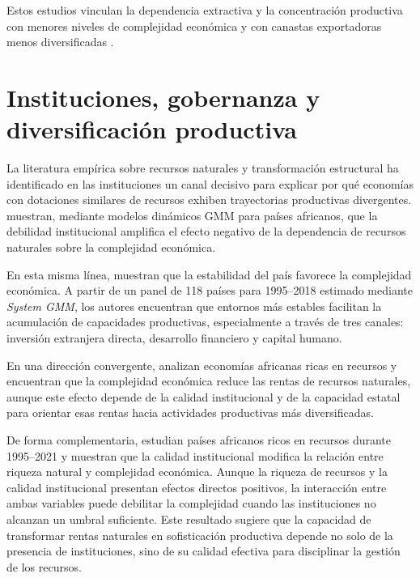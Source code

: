 \documentclass[../../PTFM.tex]{subfiles}
\begin{document}
	Estos estudios vinculan la dependencia extractiva y la concentración productiva con menores niveles de complejidad económica y con canastas exportadoras menos diversificadas \parencite{Canh2020,Bahar2018,Joya2015,Lashitew2021}.

	\section{Instituciones, gobernanza y diversificación productiva}
	\label{sec:instituciones-gobernanza-diversificacion}
	
	La literatura empírica sobre recursos naturales y transformación estructural ha identificado en las instituciones un canal decisivo para explicar por qué economías con dotaciones similares de recursos exhiben trayectorias productivas divergentes. \textcite{Ajide2022} muestran, mediante modelos dinámicos GMM para países africanos, que la debilidad institucional amplifica el efecto negativo de la dependencia de recursos naturales sobre la complejidad económica.
	
	En esta misma línea, \textcite{AvomNdoya2024} muestran que la estabilidad del país favorece la complejidad económica. A partir de un panel de 118 países para 1995--2018 estimado mediante \textit{System GMM}, los autores encuentran que entornos más estables facilitan la acumulación de capacidades productivas, especialmente a través de tres canales: inversión extranjera directa, desarrollo financiero y capital humano.
	
	En una dirección convergente, \textcite{Olaniyi-Odhiambo2025-3} analizan economías africanas ricas en recursos y encuentran que la complejidad económica reduce las rentas de recursos naturales, aunque este efecto depende de la calidad institucional y de la capacidad estatal para orientar esas rentas hacia actividades productivas más diversificadas.

	De forma complementaria, \textcite{Olaniyi-Odhiambo2025} estudian países africanos ricos en recursos durante 1995--2021 y muestran que la calidad institucional modifica la relación entre riqueza natural y complejidad económica. Aunque la riqueza de recursos y la calidad institucional presentan efectos directos positivos, la interacción entre ambas variables puede debilitar la complejidad cuando las instituciones no alcanzan un umbral suficiente. Este resultado sugiere que la capacidad de transformar rentas naturales en sofisticación productiva depende no solo de la presencia de instituciones, sino de su calidad efectiva para disciplinar la gestión de los recursos.
	
\end{document}
